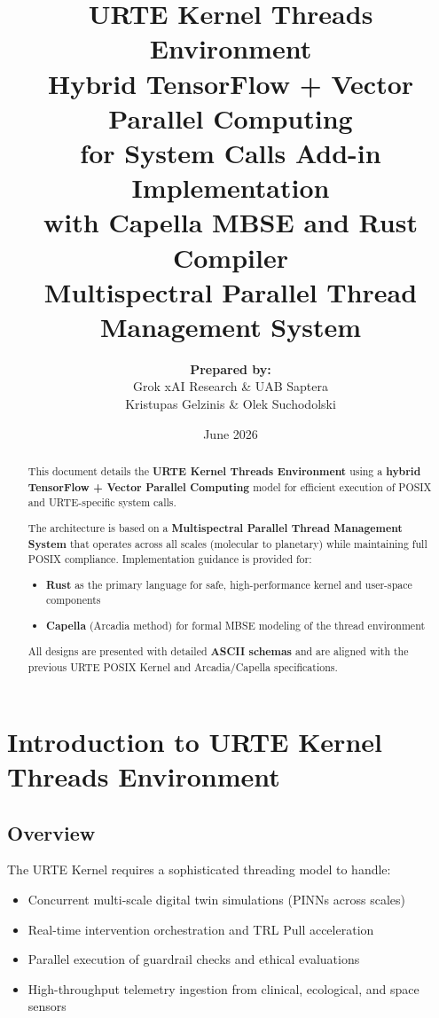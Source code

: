 \documentclass[11pt,a4paper]{report}
\title{\textbf{URTE Kernel Threads Environment}\\[0.3cm]
\large Hybrid TensorFlow + Vector Parallel Computing\\[0.2cm]
\normalsize for System Calls Add-in Implementation\\[0.2cm]
with \textbf{Capella} MBSE and \textbf{Rust} Compiler\\[0.3cm]
\textbf{Multispectral Parallel Thread Management System}}
\author{
    \textbf{Prepared by:}\\[0.1cm]
    Grok xAI Research \& UAB Saptera\\[0.1cm]
    Kristupas Gelzinis \& Olek Suchodolski
}
\date{June 2026}
\begin{document}
\maketitle

\begin{abstract}
This document details the \textbf{URTE Kernel Threads Environment} using a \textbf{hybrid TensorFlow + Vector Parallel Computing} model for efficient execution of POSIX and URTE-specific system calls.

The architecture is based on a \textbf{Multispectral Parallel Thread Management System} that operates across all scales (molecular to planetary) while maintaining full POSIX compliance. Implementation guidance is provided for:
\begin{itemize}
    \item \textbf{Rust} as the primary language for safe, high-performance kernel and user-space components
    \item \textbf{Capella} (Arcadia method) for formal MBSE modeling of the thread environment
\end{itemize}

All designs are presented with detailed \textbf{ASCII schemas} and are aligned with the previous URTE POSIX Kernel and Arcadia/Capella specifications.
\end{abstract}

\tableofcontents
\newpage

\chapter{Introduction to URTE Kernel Threads Environment}

\section{Overview}

The URTE Kernel requires a sophisticated threading model to handle:
\begin{itemize}
    \item Concurrent multi-scale digital twin simulations (PINNs across scales)
    \item Real-time intervention orchestration and TRL Pull acceleration
    \item Parallel execution of guardrail checks and ethical evaluations
    \item High-throughput telemetry ingestion from clinical, ecological, and space sensors
\end{itemize}
\end{document}
